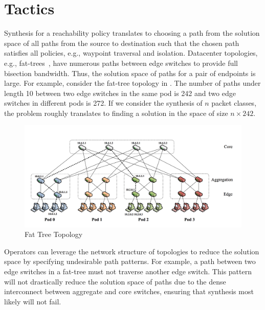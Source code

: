 \section{Tactics} \label{sec:tactic}
Synthesis for a reachability policy translates to choosing a path from
the solution space of all paths from the source to destination such
that the chosen path satisfies all policies, e.g., waypoint traversal
and isolation. Datacenter topologies, e.g., fat-trees~\cite{fattree},
have numerous paths between edge switches to provide full bisection
bandwidth.  Thus, the solution space of paths for a pair of endpoints
is large.  For example, consider the fat-tree topology in
.  The number of paths under length 10 between two
edge switches in the same pod is 242 and two edge switches in
different pods is 272.  If we consider the synthesis of $n$ packet
classes, the problem roughly translates to finding a solution in the
space of size $n \times 242$.
\begin{figure}[h]
	\includegraphics[width=\columnwidth]{figures/fattree.png}
	\caption{Fat Tree Topology}
	\label{fig:fattree}
\end{figure}
Operators can leverage the network structure of topologies to reduce
the solution space by specifying undesirable path patterns.  For
example, a path between two edge switches in a fat-tree must not
traverse another edge switch.  This pattern will not drastically
reduce the solution space of paths due to the dense interconnect
between aggregate and core switches, ensuring that synthesis most
likely will not fail.

